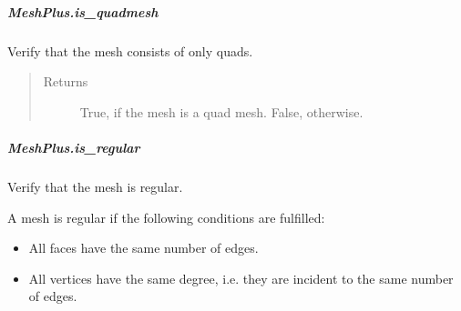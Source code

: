 \documentclass[letterpaper,10pt,english]{sphinxmanual}
\begin{document}
\begin{fulllineitems}
\begin{fulllineitems}
\end{fulllineitems}



\subparagraph{MeshPlus.is\_quadmesh}
\label{\detokenize{api/generated/directional_clustering.mesh.MeshPlus.is_quadmesh:meshplus-is-quadmesh}}\label{\detokenize{api/generated/directional_clustering.mesh.MeshPlus.is_quadmesh::doc}}

\begin{fulllineitems}
\label{\detokenize{api/generated/directional_clustering.mesh.MeshPlus.is_quadmesh:directional_clustering.mesh.MeshPlus.is_quadmesh}}
Verify that the mesh consists of only quads.
\begin{quote}\begin{description}
\item[{Returns}] \leavevmode
{} \textendash{} True, if the mesh is a quad mesh.
False, otherwise.

\end{description}\end{quote}

\end{fulllineitems}



\subparagraph{MeshPlus.is\_regular}
\label{\detokenize{api/generated/directional_clustering.mesh.MeshPlus.is_regular:meshplus-is-regular}}\label{\detokenize{api/generated/directional_clustering.mesh.MeshPlus.is_regular::doc}}

\begin{fulllineitems}
\label{\detokenize{api/generated/directional_clustering.mesh.MeshPlus.is_regular:directional_clustering.mesh.MeshPlus.is_regular}}
Verify that the mesh is regular.

A mesh is regular if the following conditions are fulfilled:
\begin{itemize}
\item {} 
All faces have the same number of edges.

\item {} 
All vertices have the same degree, i.e. they are incident to the same number of edges.


\end{itemize}
\end{fulllineitems}
\end{fulllineitems}
\end{document}
